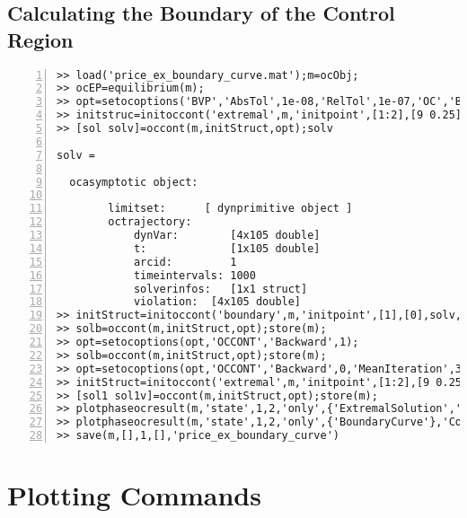 \subsection{Calculating the Boundary of the Control Region}
\begin{lstlisting}[numbers=left]
>> load('price_ex_boundary_curve.mat');m=ocObj;
>> ocEP=equilibrium(m);
>> opt=setocoptions('BVP','AbsTol',1e-08,'RelTol',1e-07,'OC','BVPSolver','bvp5c');
>> initstruc=initoccont('extremal',m,'initpoint',[1:2],[9 0.25],ocEP{1},'ContinuationType','f','IntegrationTime',1000);
>> [sol solv]=occont(m,initStruct,opt);solv
 
solv =
 
  ocasymptotic object:
 
        limitset:      [ dynprimitive object ]
        octrajectory:  
            dynVar:        [4x105 double]
            t:             [1x105 double]
            arcid:         1
            timeintervals: 1000
            solverinfos:   [1x1 struct]
            violation:  [4x105 double]
>> initStruct=initoccont('boundary',m,'initpoint',[1],[0],solv,'ContinuationType','f');
>> solb=occont(m,initStruct,opt);store(m);
>> opt=setocoptions(opt,'OCCONT','Backward',1);
>> solb=occont(m,initStruct,opt);store(m);
>> opt=setocoptions(opt,'OCCONT','Backward',0,'MeanIteration',30);
>> initStruct=initoccont('extremal',m,'initpoint',[1:2],[9 0.25],solv,'ContinuationType','f');
>> [sol1 sol1v]=occont(m,initStruct,opt);store(m);
>> plotphaseocresult(m,'state',1,2,'only',{'ExtremalSolution','Equilibrium'},'continuous','off'),hold on
>> plotphaseocresult(m,'state',1,2,'only',{'BoundaryCurve'},'Color',[0 0 0]),hold off
>> save(m,[],1,[],'price_ex_boundary_curve')
\end{lstlisting}
\section{Plotting Commands}
\label{sec:plot_results}
